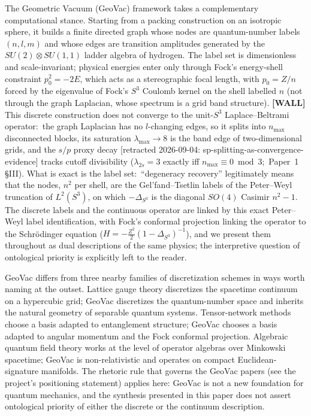 \documentclass[aps,pra,twocolumn,superscriptaddress,longbibliography]{revtex4-2}
\newcommand{\gvc}[2]{#2}
\begin{document}
The Geometric Vacuum (GeoVac) framework
\cite{loutey_paper0,loutey_paper1,loutey_paper7} takes a complementary
computational stance.  Starting from a packing construction on an
isotropic sphere, it builds a finite directed graph whose nodes are
quantum-number labels $(n, l, m)$ and whose edges are transition
amplitudes generated by the $SU(2) \otimes SU(1,1)$ ladder algebra of
hydrogen.  The label set is dimensionless and scale-invariant;
physical energies enter only through Fock's energy-shell constraint
$p_0^2 = -2E$, which acts as a stereographic focal length, with
$p_0 = Z/n$ forced by the eigenvalue of Fock's $S^3$ Coulomb kernel on
the shell labelled $n$ (\gvc{graph-s3-wall}{not through the graph Laplacian, whose spectrum is a
grid band structure}).  \textbf{[WALL]} \gvc{graph-s3-wall}{This discrete construction does
not converge to the unit-$S^3$ Laplace--Beltrami operator:\ the graph Laplacian has no $l$-changing edges, so it splits into
$n_{\max}$ disconnected blocks, its saturation $\lambda_{\max} \to 8$ is
the band edge of two-dimensional grids, and the $s/p$ proxy decay
[retracted 2026-09-04: sp-splitting-as-convergence-evidence] tracks cutoff
divisibility ($\lambda_{2s} = 3$ exactly iff $n_{\max} \equiv 0 \bmod 3$;\
Paper~1 \S III)}.  What is exact is the label set:\ ``degeneracy recovery''
legitimately means that the nodes, $n^2$ per shell, are the
Gel'fand--Tsetlin labels of the Peter--Weyl truncation of $L^2(S^3)$,
on which $-\Delta_{S^3}$ is the diagonal $SO(4)$ Casimir $n^2 - 1$.  The
discrete labels and the continuous operator are linked by this exact
Peter--Weyl label identification, with Fock's conformal
projection linking the operator to the Schr\"odinger equation
($H = -\tfrac{Z^2}{2}(1-\Delta_{S^3})^{-1}$), and we present them throughout as dual descriptions of
the same physics; the interpretive question of ontological priority is
explicitly left to the reader.

GeoVac differs from three nearby families of discretization schemes
in ways worth naming at the outset.  Lattice gauge theory discretizes
the spacetime continuum on a hypercubic grid; GeoVac discretizes the
quantum-number space and inherits the natural geometry of separable
quantum systems.  Tensor-network methods choose a basis adapted to
entanglement structure; GeoVac chooses a basis adapted to angular
momentum and the Fock conformal projection.  Algebraic quantum field
theory works at the level of operator algebras over Minkowski
spacetime; GeoVac is non-relativistic and operates on compact
Euclidean-signature manifolds.  The rhetoric rule that governs the
GeoVac papers (see the project's positioning statement) applies here:
GeoVac is not a new foundation for quantum mechanics, and the
synthesis presented in this paper does not assert ontological priority
of either the discrete or the continuum description.
\end{document}
